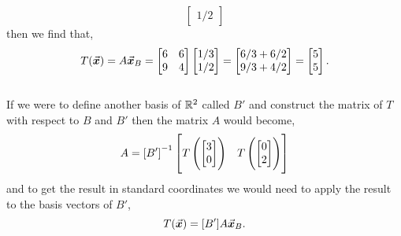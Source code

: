 \documentclass[MathsNotesBase.tex]{subfiles}
\begin{document}
{\begin{exe}
{\[\begin{bmatrix}
													1/2
													\end{bmatrix}									
				\]
				then we find that,
				\[ T(\vec{\bm{x}}) = A\vec{\bm{x}}_B = \begin{bmatrix}
									6 & 6\\
									9 & 4
									\end{bmatrix}
									\begin{bmatrix}
									1/3\\
									1/2
									\end{bmatrix} =
									\begin{bmatrix}
									6/3 + 6/2\\
									9/3 + 4/2
									\end{bmatrix} =
									\begin{bmatrix}
									5\\
									5
									\end{bmatrix}.
				\]
				\\If we were to define another basis of $\mathbb{R}^{2}$ called $B'$ and construct the matrix of $T$ with respect to $B$ and $B'$ then the matrix $A$ would become,
				\[ A = {[B']}^{-1}\begin{bmatrix}
						T\left(\begin{bmatrix}3 \\ 0\end{bmatrix}\right) & T\left(\begin{bmatrix}0 \\ 2\end{bmatrix}\right)
						\end{bmatrix}
				\]
				and to get the result in standard coordinates we would need to apply the result to the basis vectors of $B'$,
				\[ T(\vec{\bm{x}}) = [B']A\vec{\bm{x}}_B. \]
				
}
\end{exe}}
\end{document}

